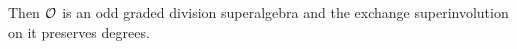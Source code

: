 \begin{ex}
    Then $\mathcal O$ is an odd graded division superalgebra and the exchange superinvolution on it preserves degrees. 
\end{ex}

